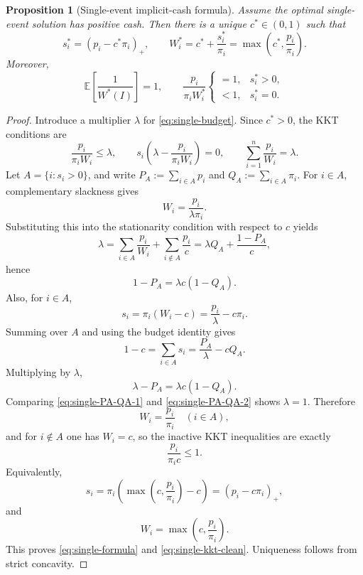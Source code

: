 \documentclass[11pt]{article}
\numberwithin{equation}{section}
\newtheorem{proposition}[theorem]{Proposition}
\theoremstyle{remark}
\theoremstyle{definition}
\newcommand{\E}{\mathbb{E}}
\newcommand{\1}{\mathbf{1}}
\begin{document}
\begin{proposition}[Single-event implicit-cash formula]
\label{prop:single-event}
Assume the optimal single-event solution has positive cash. Then there is a unique $c^*\in(0,1)$ such that
\begin{equation}
  s_i^* = (p_i-c^*\pi_i)_+,
  \qquad
  W_i^* = c^* + \frac{s_i^*}{\pi_i} = \max\!\left(c^*,\frac{p_i}{\pi_i}\right).
  \label{eq:single-formula}
\end{equation}
Moreover,
\begin{equation}
  \E\!\left[\frac{1}{W^*(I)}\right] = 1,
  \qquad
  \frac{p_i}{\pi_i W_i^*}
  \begin{cases}
    =1,& s_i^*>0,\\
    <1,& s_i^*=0.
  \end{cases}
  \label{eq:single-kkt-clean}
\end{equation}
\end{proposition}

\begin{proof}
Introduce a multiplier $\lambda$ for \eqref{eq:single-budget}. Since $c^*>0$, the KKT conditions are
\[
  \frac{p_i}{\pi_i W_i}\le \lambda,
  \qquad
  s_i\!\left(\lambda-\frac{p_i}{\pi_i W_i}\right)=0,
  \qquad
  \sum_{i=1}^n \frac{p_i}{W_i} = \lambda.
\]
Let $A=\{i:s_i>0\}$, and write $P_A:=\sum_{i\in A}p_i$ and $Q_A:=\sum_{i\in A}\pi_i$. For $i\in A$, complementary slackness gives
\[
  W_i=\frac{p_i}{\lambda\pi_i}.
\]
Substituting this into the stationarity condition with respect to $c$ yields
\[
  \lambda
  =\sum_{i\in A}\frac{p_i}{W_i}+\sum_{i\notin A}\frac{p_i}{c}
  =\lambda Q_A+\frac{1-P_A}{c},
\]
hence
\begin{equation}
  1-P_A=\lambda c(1-Q_A).
  \label{eq:single-PA-QA-1}
\end{equation}
Also, for $i\in A$,
\[
  s_i=\pi_i(W_i-c)=\frac{p_i}{\lambda}-c\pi_i.
\]
Summing over $A$ and using the budget identity gives
\[
  1-c=\sum_{i\in A}s_i=\frac{P_A}{\lambda}-cQ_A.
\]
Multiplying by $\lambda$,
\begin{equation}
  \lambda-P_A=\lambda c(1-Q_A).
  \label{eq:single-PA-QA-2}
\end{equation}
Comparing \eqref{eq:single-PA-QA-1} and \eqref{eq:single-PA-QA-2} shows $\lambda=1$. Therefore
\[
  W_i=\frac{p_i}{\pi_i}\quad (i\in A),
\]
and for $i\notin A$ one has $W_i=c$, so the inactive KKT inequalities are exactly
\[
  \frac{p_i}{\pi_i c}\le 1.
\]
Equivalently,
\[
  s_i=\pi_i\!\left(\max\!\left(c,\frac{p_i}{\pi_i}\right)-c\right)
  =(p_i-c\pi_i)_+,
\]
and
\[
  W_i=\max\!\left(c,\frac{p_i}{\pi_i}\right).
\]
This proves \eqref{eq:single-formula} and \eqref{eq:single-kkt-clean}. Uniqueness follows from strict concavity.
\end{proof}
\end{document}
